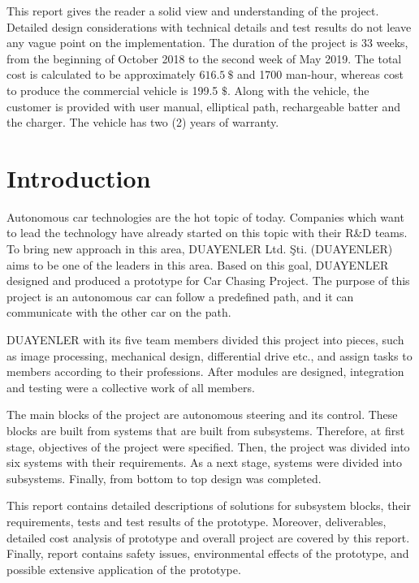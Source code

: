 \documentclass[a4paper,12pt]{article}
\begin{document}
This report gives the reader a solid view and understanding of the project. Detailed design considerations with technical details and test results do not leave any vague point on the implementation. The duration of the project is 33 weeks, from the beginning of October 2018 to the second week of May 2019. The total cost is calculated to be approximately $616.5~\$$ and  1700 man-hour, whereas cost to produce the commercial vehicle is 199.5 $\$$. Along with the vehicle, the customer is provided with user manual, elliptical path, rechargeable batter and the charger. The vehicle has two (2) years of warranty.

\newpage
	\section{Introduction}

Autonomous car technologies are the hot topic of today. Companies which want to lead the technology have already started on this topic with their R\&D teams. To bring new approach in this area, DUAYENLER Ltd. Şti. (DUAYENLER) aims to be one of the leaders in this area. Based on this goal, DUAYENLER designed and produced a prototype for Car Chasing Project. The purpose of this project is an autonomous car can follow a predefined path, and it can communicate with the other car on the path.  

DUAYENLER with its five team members divided this project into pieces, such as image processing, mechanical design, differential drive etc., and assign tasks to members according to their professions. After modules are designed, integration and testing were a collective work of all members.  

The main blocks of the project are autonomous steering and its control. These blocks are built from systems that are built from subsystems. Therefore, at first stage, objectives of the project were specified. Then, the project was divided into six systems with their requirements. As a next stage, systems were divided into subsystems. Finally, from bottom to top design was completed. 

This report contains detailed descriptions of solutions for subsystem blocks, their requirements, tests and test results of the prototype. Moreover, deliverables, detailed cost analysis of prototype and overall project are covered by this report. Finally, report contains safety issues, environmental effects of the prototype, and possible extensive application of the prototype. 
\end{document}
